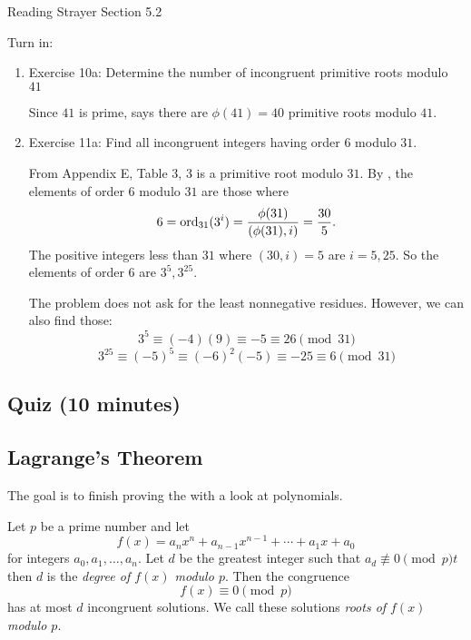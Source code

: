 \documentclass[letterpaper, 11 pt]{ximera}
\begin{document}
\begin{pre}
    \item[Reading] Strayer Section 5.2
    \item[Turn in:] 
    
    \begin{enumerate}
        \item Exercise 10a: Determine the number of incongruent primitive roots modulo $41$
        \begin{solution}
            Since $41$ is prime,  says there are $\phi(41)=40$ primitive roots modulo $41.$
        \end{solution}
        \item Exercise 11a: Find all incongruent integers having order $6$ modulo $31.$
        \begin{solution}
                From Appendix E, Table 3, $3$ is a primitive root modulo $31.$ By , the elements of order $6$ modulo $31$ are those where \[6=\operatorname{ord}_{31}(3^i)=\frac{\phi(31)}{(\phi(31),i)}=\frac{30}{5}.\] The positive integers less than $31$ where $(30,i)=5$ are $i=5,25.$ So the elements of order $6$ are $3^5, 3^{25}.$
                

                The problem does not ask for the least nonnegative residues. However, we can also find those:
                    \[
                        3^5\equiv (-4)(9)\equiv -5\equiv 26\pmod{31}
                    \]
                    \[
                        3^{25}\equiv (-5)^{5}\equiv (-6)^2(-5)\equiv -25\equiv 6\pmod{31}
                    \]
            \end{solution}
    \end{enumerate}
\end{pre}

\subsection{Quiz (10 minutes)}
\subsection{Lagrange's Theorem}
    The goal is to finish proving the  with a look at polynomials.

    \begin{thm*}\label{thm:lagrange}
        Let $p$ be a prime number and let 
        \[f(x)=a_n x^n +a_{n-1} x^{n-1}+\cdots +a_1 x+a_0\]
        for integers $a_0,a_1,\dots,a_n.$ Let $d$ be the greatest integer such that $a_d\not\equiv 0\pmod{p}t$ then $d$ is the \emph{degree of $f(x)$ modulo $p.$}
        Then the congruence 
        \[f(x)\equiv 0\pmod{p}\]
        has at most $d$ incongruent solutions. We call these solutions \emph{roots of $f(x)$ modulo $p.$}
    \end{thm*}
\end{document}
